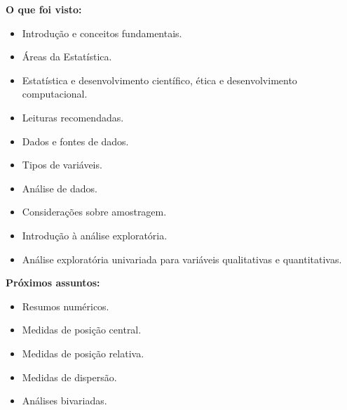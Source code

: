 \documentclass[
  ignorenonframetext,
  serif,
  professionalfont,
  usenames,
  dvipsnames,
  aspectratio = 169]{beamer}
\providecommand{\tightlist}{%
  \setlength{\itemsep}{0pt}\setlength{\parskip}{0pt}}
\renewcommand{\tightlist}{%
  \setlength{\itemsep}{0\baselineskip}
  \setlength{\parskip}{0.25\baselineskip}
}
\def\beginAHalfColumn{\begin{minipage}{0.49\textwidth}}%
\def\endColumns{\end{minipage}}%
\begin{document}
\begin{frame}{}
\label{section-1}
\beginAHalfColumn

\textbf{O que foi visto:}

\begin{itemize}
\tightlist
\item
  Introdução e conceitos fundamentais.
\item
  Áreas da Estatística.
\item
  Estatística e desenvolvimento científico, ética e desenvolvimento
  computacional.
\item
  Leituras recomendadas.
\item
  Dados e fontes de dados.
\item
  Tipos de variáveis.
\item
  Análise de dados.
\item
  Considerações sobre amostragem.
\item
  Introdução à análise exploratória.
\item
  Análise exploratória univariada para variáveis qualitativas e
  quantitativas.
\end{itemize}

\endColumns
\beginAHalfColumn

\textbf{Próximos assuntos:}

\begin{itemize}
\tightlist
\item
  Resumos numéricos.
\item
  Medidas de posição central.
\item
  Medidas de posição relativa.
\item
  Medidas de dispersão.
\item
  Análises bivariadas.
\end{itemize}

\endColumns
\end{frame}
\end{document}
